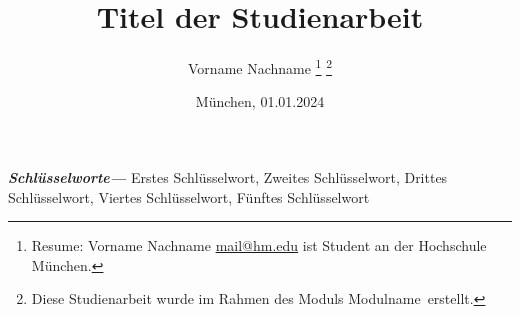 \title{Titel der Studienarbeit}
\author{
    Vorname Nachname
    \thanks{Resume: Vorname Nachname \href{mailto:mail@hm.edu}{mail@hm.edu} ist Student an der Hochschule München.}%
    \thanks{Diese Studienarbeit wurde im Rahmen des Moduls \glqq Modulname\grqq\ erstellt.}%
}
\date{München, 01.01.2024}
\maketitle

\vspace{-1cm} %



\providecommand{\keywords}[1]
{
  \small	
  \textbf{\textit{Schlüsselworte---}} #1
}
\keywords{
    Erstes Schlüsselwort, Zweites Schlüsselwort, Drittes Schlüsselwort, Viertes Schlüsselwort, Fünftes Schlüsselwort
}

